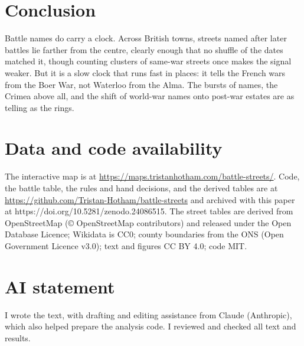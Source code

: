 \documentclass[11pt,a4paper]{article}
\begin{document}
\section{Conclusion}
Battle names do carry a clock. Across British towns, streets named after later battles lie farther from the centre, clearly enough that no shuffle of the dates matched it, though counting clusters of same-war streets once makes the signal weaker. But it is a slow clock that runs fast in places: it tells the French wars from the Boer War, not Waterloo from the Alma. The bursts of names, the Crimea above all, and the shift of world-war names onto post-war estates are as telling as the rings.

\section*{Data and code availability}
The interactive map is at \url{https://maps.tristanhotham.com/battle-streets/}. Code, the battle table, the rules and hand decisions, and the derived tables are at \url{https://github.com/Tristan-Hotham/battle-streets} and archived with this paper at https://doi.org/10.5281/zenodo.24086515. The street tables are derived from OpenStreetMap (\copyright{} OpenStreetMap contributors) and released under the Open Database Licence; Wikidata is CC0; county boundaries from the ONS (Open Government Licence v3.0); text and figures CC BY 4.0; code MIT.

\section*{AI statement}
I wrote the text, with drafting and editing assistance from Claude (Anthropic), which also helped prepare the analysis code. I reviewed and checked all text and results.
\end{document}
